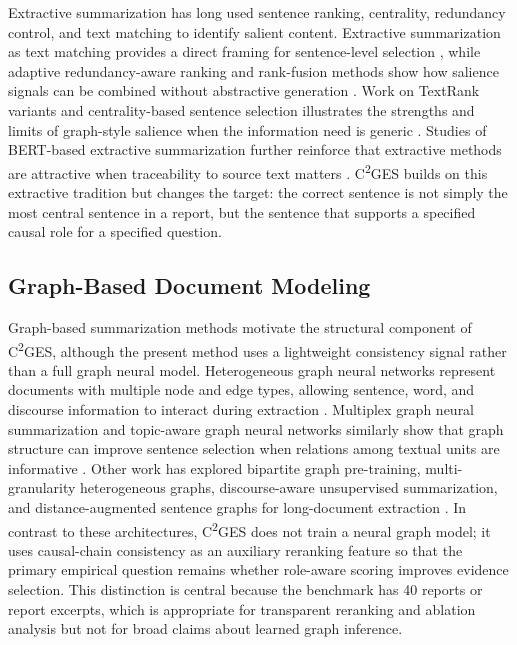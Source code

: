 \documentclass{article}
\begin{document}
Extractive summarization has long used sentence ranking, centrality, redundancy control, and text matching to identify salient content. Extractive summarization as text matching provides a direct framing for sentence-level selection \cite{zhong2020extractive}, while adaptive redundancy-aware ranking and rank-fusion methods show how salience signals can be combined without abstractive generation \cite{bi2021aredsum,joshi2022ranksuman}. Work on TextRank variants and centrality-based sentence selection illustrates the strengths and limits of graph-style salience when the information need is generic \cite{khor2021text,belwal2020graphbased}. Studies of BERT-based extractive summarization further reinforce that extractive methods are attractive when traceability to source text matters \cite{abdelsalam2022performance}. C\textsuperscript{2}GES builds on this extractive tradition but changes the target: the correct sentence is not simply the most central sentence in a report, but the sentence that supports a specified causal role for a specified question.

\subsection{Graph-Based Document Modeling}
\label{sec:graph_based}

Graph-based summarization methods motivate the structural component of C\textsuperscript{2}GES, although the present method uses a lightweight consistency signal rather than a full graph neural model. Heterogeneous graph neural networks represent documents with multiple node and edge types, allowing sentence, word, and discourse information to interact during extraction \cite{wang2020heterogeneous}. Multiplex graph neural summarization and topic-aware graph neural networks similarly show that graph structure can improve sentence selection when relations among textual units are informative \cite{jing2021multiplex,cui2020enhancing}. Other work has explored bipartite graph pre-training, multi-granularity heterogeneous graphs, discourse-aware unsupervised summarization, and distance-augmented sentence graphs for long-document extraction \cite{mao2023bipartite,zhao2023multigranularity,dong2021discourseaware,liu2021unsupervised}. In contrast to these architectures, C\textsuperscript{2}GES does not train a neural graph model; it uses causal-chain consistency as an auxiliary reranking feature so that the primary empirical question remains whether role-aware scoring improves evidence selection. This distinction is central because the benchmark has 40 reports or report excerpts, which is appropriate for transparent reranking and ablation analysis but not for broad claims about learned graph inference.
\end{document}
